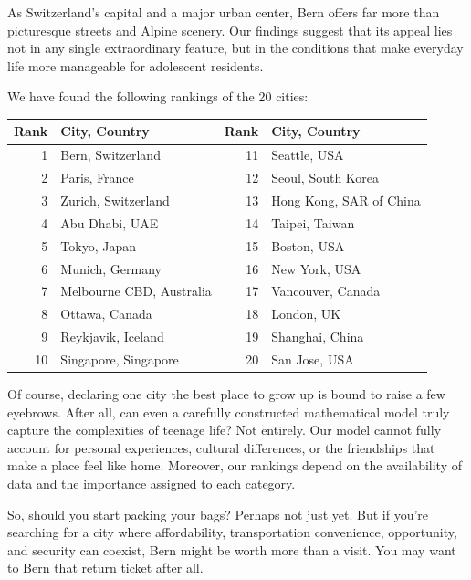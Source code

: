 \documentclass[11pt,letterpaper]{article}
\renewcommand{\arraystretch}{1.12}
\begin{document}
\par\indent As Switzerland's capital and a major urban center, Bern offers far more than picturesque streets and Alpine scenery. Our findings suggest that its appeal lies not in any single extraordinary feature, but in the conditions that make everyday life more manageable for adolescent residents.

\par\medskip
\noindent We have found the following rankings of the 20 cities:
\begin{center}
\vspace{0.55em}
\fontsize{10.5}{14}\selectfont
\setlength{\tabcolsep}{13pt}
\renewcommand{\arraystretch}{1.12}
\begin{tabular}{r l r l}
\toprule
\textbf{Rank} & \textbf{City, Country} & \textbf{Rank} & \textbf{City, Country} \\
\midrule
1 & Bern, Switzerland & 11 & Seattle, USA \\
2 & Paris, France & 12 & Seoul, South Korea \\
3 & Zurich, Switzerland & 13 & Hong Kong, SAR of China \\
4 & Abu Dhabi, UAE & 14 & Taipei, Taiwan \\
5 & Tokyo, Japan & 15 & Boston, USA \\
6 & Munich, Germany & 16 & New York, USA \\
7 & Melbourne CBD, Australia & 17 & Vancouver, Canada \\
8 & Ottawa, Canada & 18 & London, UK \\
9 & Reykjavik, Iceland & 19 & Shanghai, China \\
10 & Singapore, Singapore & 20 & San Jose, USA \\
\bottomrule
\end{tabular}
\end{center}

\par\indent Of course, declaring one city the best place to grow up is bound to raise a few eyebrows. After all, can even a carefully constructed mathematical model truly capture the complexities of teenage life? Not entirely. Our model cannot fully account for personal experiences, cultural differences, or the friendships that make a place feel like home. Moreover, our rankings depend on the availability of data and the importance assigned to each category.

\par\indent So, should you start packing your bags? Perhaps not just yet. But if you're searching for a city where affordability, transportation convenience, opportunity, and security can coexist, Bern might be worth more than a visit. You may want to Bern that return ticket after all.
\end{document}
